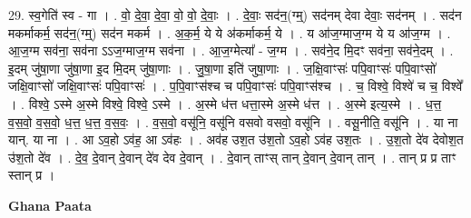\documentclass[17pt]{extarticle}
\begin{document}
29. स्व॒गेति॑ स्व - गा । . वो॒ दे॒वा॒ दे॒वा॒ वो॒ वो॒ दे॒वाः॒ । . दे॒वाः॒ सद॑न॒(ग्म्॒) सद॑नम् देवा देवाः॒ सद॑नम् । . सद॑न मकर्माकर्म॒ सद॑न॒(ग्म्॒) सद॑न मकर्म । . अ॒क॒र्म॒ ये ये अ॑कर्माकर्म॒ ये । . य आ॑ज॒ग्माज॒ग्म ये य आ॑ज॒ग्म । . आ॒ज॒ग्म सव॑ना॒ सव॑ना ऽऽज॒ग्माज॒ग्म सव॑ना । . आ॒ज॒ग्मेत्या᳚ - ज॒ग्म । . सव॑ने॒द मि॒दꣳ सव॑ना॒ सव॑ने॒दम् । . इ॒दम् जु॑षा॒णा जु॑षा॒णा इ॒द मि॒दम् जु॑षा॒णाः । . जु॒षा॒णा इति॑ जुषा॒णाः । . ज॒क्षि॒वाꣳसः॑ पपि॒वाꣳसः॑ पपि॒वाꣳसो॑ जक्षि॒वाꣳसो॑ जक्षि॒वाꣳसः॑ पपि॒वाꣳसः॑ । . प॒पि॒वाꣳस॑श्च च पपि॒वाꣳसः॑ पपि॒वाꣳस॑श्च । . च॒ विश्वे॒ विश्वे॑ च च॒ विश्वे᳚ । . विश्वे॒ ऽस्मे अ॒स्मे विश्वे॒ विश्वे॒ ऽस्मे । . अ॒स्मे ध॑त्त धत्ता॒स्मे अ॒स्मे ध॑त्त । . अ॒स्मे इत्य॒स्मे । . ध॒त्त॒ व॒स॒वो॒ व॒स॒वो॒ ध॒त्त॒ ध॒त्त॒ व॒स॒वः॒ । . व॒स॒वो॒ वसू॑नि॒ वसू॑नि वसवो वसवो॒ वसू॑नि । . वसू॒नीति॒ वसू॑नि । . या ना यान्. या ना । . आ ऽव॒हो ऽव॑ह॒ आ ऽव॑हः । . अव॑ह उश॒त उ॑श॒तो ऽव॒हो ऽव॑ह उश॒तः । . उ॒श॒तो दे॑व देवोश॒त उ॑श॒तो दे॑व । . दे॒व॒ दे॒वान् दे॒वान् दे॑व देव दे॒वान् । . दे॒वान् ताꣳस् तान् दे॒वान् दे॒वान् तान् । . तान् प्र प्र ताꣳ स्तान् प्र । \newline

\textbf{Ghana Paata } \newline
\end{document}
